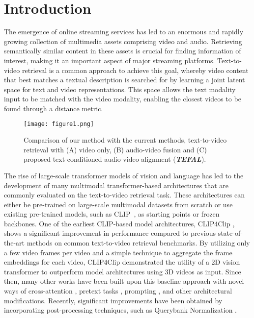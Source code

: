 \documentclass[10pt,twocolumn,letterpaper]{article}
\begin{document}
\section{Introduction}
\label{sec:intro}

The emergence of online streaming services has led to an enormous and rapidly growing collection of multimedia assets comprising video and audio. Retrieving semantically similar content in these assets is crucial for finding information of interest, making it an important aspect of major streaming platforms. Text-to-video retrieval is a common approach to achieve this goal, whereby video content that best matches a textual description is searched for by learning a joint latent space for text and video representations. This space allows the text modality input to be matched with the video modality, enabling the closest videos to be found through a distance metric.

\begin{figure}[t]
  \centering
  \texttt{[image: figure1.png]}
   \caption{Comparison of our method with the current methods, text-to-video retrieval with (A) video only, (B) audio-video fusion and (C) proposed text-conditioned audio-video alignment (\textbf{\textit{TEFAL}}).}
   \label{fig:fig1}
\end{figure}

The rise of large-scale transformer models of vision and language has led to the development of many multimodal transformer-based architectures that are commonly evaluated on the text-to-video retrieval task. These architectures can either be pre-trained on large-scale multimodal datasets from scratch or use existing pre-trained models, such as CLIP~\cite{clip}, as starting points or frozen backbones. One of the earliest CLIP-based model architectures, CLIP4Clip \cite{Luo2022CLIP4ClipAE}, shows a significant improvement in performance compared to previous state-of-the-art methods \cite{Bain21frozen, lei2021clipbert, li2020hero} on common text-to-video retrieval benchmarks. By utilizing only a few video frames per video and a simple technique to aggregate the frame embeddings for each video, CLIP4Clip demonstrated the utility of a 2D vision transformer to outperform model architectures using 3D videos as input. Since then, many other works have been built upon this baseline approach with novel ways of cross-attention \cite{gorti2022xpool}, pretext tasks \cite{bridgeformer}, prompting \cite{alpro}, and other architectural modifications. Recently, significant improvements have been obtained by incorporating post-processing techniques, such as Querybank Normalization \cite{qbnorm}.
\end{document}
